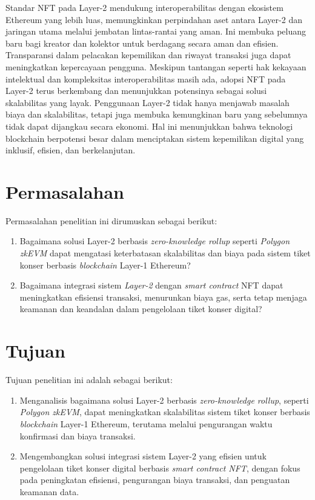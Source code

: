 Standar NFT pada Layer-2 mendukung interoperabilitas dengan ekosistem Ethereum
yang lebih luas, memungkinkan perpindahan aset antara Layer-2 dan jaringan
utama melalui jembatan lintas-rantai yang aman. Ini membuka peluang baru bagi
kreator dan kolektor untuk berdagang secara aman dan efisien. Transparansi
dalam pelacakan kepemilikan dan riwayat transaksi juga dapat meningkatkan
kepercayaan pengguna. Meskipun tantangan seperti hak kekayaan intelektual dan
kompleksitas interoperabilitas masih ada, adopsi NFT pada Layer-2 terus
berkembang dan menunjukkan potensinya sebagai solusi skalabilitas yang layak.
Penggunaan Layer-2 tidak hanya menjawab masalah biaya dan skalabilitas, tetapi
juga membuka kemungkinan baru yang sebelumnya tidak dapat dijangkau secara
ekonomi. Hal ini menunjukkan bahwa teknologi blockchain berpotensi besar dalam
menciptakan sistem kepemilikan digital yang inklusif, efisien, dan
berkelanjutan.

\section{Permasalahan}
\label{sec:permasalahan}

Permasalahan penelitian ini dirumuskan sebagai berikut:
\begin{enumerate}
      \item Bagaimana solusi Layer-2 berbasis \textit{zero-knowledge rollup} seperti
            \textit{Polygon zkEVM} dapat mengatasi keterbatasan skalabilitas dan biaya pada
            sistem tiket konser berbasis \textit{blockchain} Layer-1 Ethereum?
      \item Bagaimana integrasi sistem \textit{Layer-2} dengan \emph{smart contract} NFT
            dapat meningkatkan efisiensi transaksi, menurunkan biaya gas, serta tetap
            menjaga keamanan dan keandalan dalam pengelolaan tiket konser digital?
\end{enumerate}

\section{Tujuan}
Tujuan penelitian ini adalah sebagai berikut:
\begin{enumerate}
      \item Menganalisis bagaimana solusi Layer-2 berbasis \textit{zero-knowledge rollup},
            seperti \textit{Polygon zkEVM}, dapat meningkatkan skalabilitas sistem tiket
            konser berbasis \textit{blockchain} Layer-1 Ethereum, terutama melalui
            pengurangan waktu konfirmasi dan biaya transaksi.
      \item Mengembangkan solusi integrasi sistem Layer-2 yang efisien untuk pengelolaan
            tiket konser digital berbasis \textit{smart contract NFT}, dengan fokus pada
            peningkatan efisiensi, pengurangan biaya transaksi, dan penguatan keamanan
            data.
\end{enumerate}

